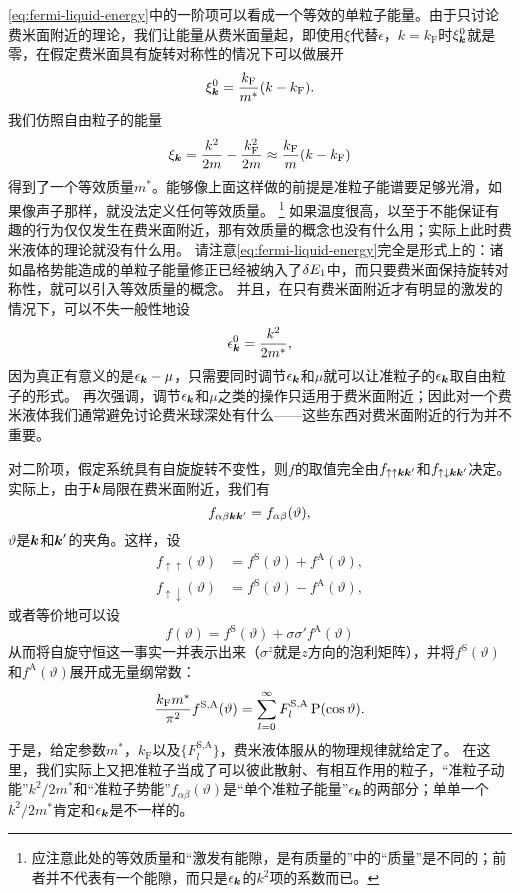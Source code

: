 \eqref{eq:fermi-liquid-energy}中的一阶项可以看成一个等效的单粒子能量。由于只讨论费米面附近的理论，我们让能量从费米面量起，即使用$\xi$代替$\epsilon$，$k=k_\text{F}$时$\xi^0_{\vb*{k}}$就是零，在假定费米面具有旋转对称性的情况下可以做展开
\[
    \xi^0_{\vb*{k}} = \frac{k_\text{F}}{m^*} (k - k_\text{F}).
\]
我们仿照自由粒子的能量
\[
    \xi_{\vb*{k}} = \frac{k^2}{2m} - \frac{k_\text{F}^2}{2m} \approx \frac{k_\text{F}}{m} (k - k_\text{F})
\]
得到了一个等效质量$m^*$。能够像上面这样做的前提是准粒子能谱要足够光滑，如果像声子那样，就没法定义任何等效质量。%
\footnote{应注意此处的等效质量和“激发有能隙，是有质量的”中的“质量”是不同的；前者并不代表有一个能隙，而只是$\epsilon_{\vb*{k}}$的$k^2$项的系数而已。}%
如果温度很高，以至于不能保证有趣的行为仅仅发生在费米面附近，那有效质量的概念也没有什么用；实际上此时费米液体的理论就没有什么用。
请注意\eqref{eq:fermi-liquid-energy}完全是形式上的：诸如晶格势能造成的单粒子能量修正已经被纳入了$\var{E_1}$中，而只要费米面保持旋转对称性，就可以引入等效质量的概念。
并且，在只有费米面附近才有明显的激发的情况下，可以不失一般性地设
\[
    \epsilon_{\vb*{k}}^0 = \frac{k^2}{2m^*},
\]
因为真正有意义的是$\epsilon_{\vb*{k}} - \mu$，只需要同时调节$\epsilon_{\vb*{k}}$和$\mu$就可以让准粒子的$\epsilon_{\vb*{k}}$取自由粒子的形式。
再次强调，调节$\epsilon_{\vb*{k}}$和$\mu$之类的操作只适用于费米面附近；因此对一个费米液体我们通常避免讨论费米球深处有什么——这些东西对费米面附近的行为并不重要。

对二阶项，假定系统具有自旋旋转不变性，则$f$的取值完全由$f_{\uparrow \uparrow \vb*{k} \vb*{k}'}$和$f_{\uparrow \downarrow \vb*{k} \vb*{k}'}$决定。
实际上，由于$\vb*{k}$局限在费米面附近，我们有
\[
    f_{\alpha \beta \vb*{k} \vb*{k}'} = f_{\alpha \beta}(\vartheta),
\]
$\vartheta$是$\vb*{k}$和$\vb*{k}'$的夹角。这样，设
\begin{equation}
    \begin{aligned}
        f_{\uparrow \uparrow}(\vartheta) &= f^\text{S}(\vartheta) + f^\text{A}(\vartheta), \\
        f_{\uparrow \downarrow}(\vartheta) &= f^\text{S}(\vartheta) - f^\text{A}(\vartheta),
    \end{aligned}
\end{equation}
或者等价地可以设
\begin{equation}
    {f}(\vartheta) = f^\text{S}(\vartheta) + {\sigma} {\sigma}' f^\text{A}(\vartheta)
\end{equation}
从而将自旋守恒这一事实一并表示出来（${\sigma}^z$就是$z$方向的泡利矩阵），并将$f^\text{S}(\vartheta)$和$f^\text{A}(\vartheta)$展开成无量纲常数：
\begin{equation}
    \frac{k_\text{F} m^*}{\pi^2} f^\text{S,A}(\vartheta) = \sum_{l=0}^\infty F_l^\text{S,A} \operatorname{P} (\cos \vartheta).
\end{equation}
于是，给定参数$m^*$，$k_\text{F}$以及$\{F_l^\text{S,A}\}$，费米液体服从的物理规律就给定了。
在这里，我们实际上又把准粒子当成了可以彼此散射、有相互作用的粒子，“准粒子动能”$k^2/2m^*$和“准粒子势能”$f_{\alpha \beta}(\vartheta)$是“单个准粒子能量”$\epsilon_{\vb*{k}}$的两部分；单单一个$k^2/2m^*$肯定和$\epsilon_{\vb*{k}}$是不一样的。

